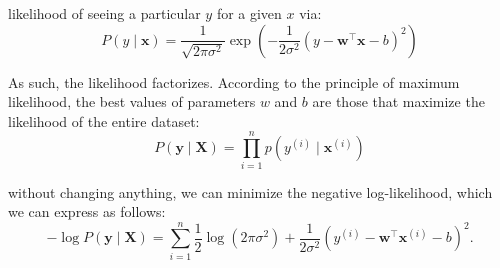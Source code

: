 likelihood of seeing a particular $y$ for a given $x$ via:
\[
    \displaystyle
    P(y \mid \mathbf{x}) = \frac{1}{\sqrt{2 \pi \sigma^2}} \exp\left(-\frac{1}{2 \sigma^2} (y - \mathbf{w}^\top \mathbf{x} - b)^2\right)
\]

As such, the likelihood factorizes. According to the principle of maximum likelihood, the best values of parameters $w$ and $b$ are those that maximize the likelihood of the entire dataset:
\[
    \displaystyle
    P(\mathbf y \mid \mathbf X) = \prod_{i=1}^{n} p(y^{(i)} \mid \mathbf{x}^{(i)})
\]

without changing anything, we can minimize the negative log-likelihood, which we can express as follows:
\[
    \displaystyle
    -\log P(\mathbf y \mid \mathbf X) = \sum_{i=1}^n \frac{1}{2} \log(2 \pi \sigma^2) + \frac{1}{2 \sigma^2} \left(y^{(i)} - \mathbf{w}^\top \mathbf{x}^{(i)} - b\right)^2.
\]





































